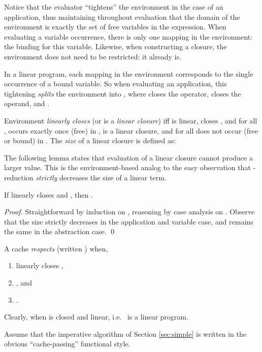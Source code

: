 \documentclass{llncs}
\begin{document}
Notice that the evaluator ``tightens'' the environment in the case of
an application, thus maintaining throughout evaluation that the domain
of the environment is exactly the set of free variables in the
expression.  When evaluating a variable occurrence, there is only one
mapping in the environment: the binding for this variable. Likewise,
when constructing a closure, the environment does not need to be
restricted: it already is.

In a linear program, each mapping in the environment corresponds to
the single occurrence of a bound variable.  So when evaluating an
application, this tightening {\em splits} the environment  into
, where  closes the operator,  closes
the operand, and .





\begin{definition}
Environment  {\em linearly closes}  (or  is a {\em linear closure}) iff  is linear, 
closes , and for all ,  occurs exactly once
(free) in ,  is a linear closure, and for all
 does not occur (free or bound) in . The
{\em size} of a linear closure  is defined as:

\end{definition}

The following lemma states that evaluation of a linear closure cannot
produce a larger value.  This is the environment-based analog to the
easy observation that -reduction {\em strictly} decreases the
size of a linear term.
\begin{lemma}\label{lem:smaller}
If  linearly closes  and , then
.
\end{lemma}
\begin{proof}
Straightforward by induction on , reasoning by case analysis
on .  Observe that the size strictly decreases in the application
and variable case, and remains the same in the abstraction case.  \qed
\end{proof}

\begin{definition}
A cache  {\em respects}  (written ) when,
\begin{enumerate}
\item  linearly closes ,
\item , and
\item .
\end{enumerate}
\end{definition}
Clearly,  when  is closed and linear,
i.e.~ is a linear program.

Assume that the imperative algorithm  of Section
\ref{sec:simple} is written in the obvious ``cache-passing''
functional style.  
\end{document}
